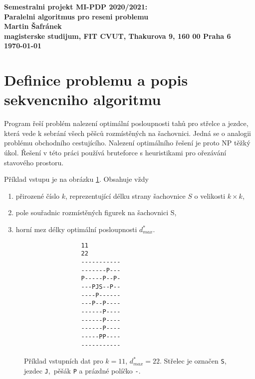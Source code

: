 \documentclass{article}
\begin{document}
    \begin{center}
        \bf Semestralni projekt MI-PDP 2020/2021:\\[5mm]
        Paralelni algoritmus pro reseni problemu\\[5mm]
        Martin Šafránek\\[2mm]
        magisterske studijum, FIT CVUT, Thakurova 9, 160 00 Praha 6\\[2mm]
        \today
    \end{center}


    \section{Definice problemu a popis sekvencniho algoritmu}

    Program řeší problém nalezení optimální posloupnosti tahů pro střelce a jezdce, která vede k sebrání
    všech pěšců rozmístěných na šachovnici. Jedná se o analogii problému obchodního cestujícího.
    Nalezení optimálního řešení je proto NP těžký úkol. Řešení v této práci používá bruteforce
    s heuristikami pro ořezávání stavového prostoru.

    Příklad vstupu je na obrázku \ref{fig:board-example}. Obsahuje vždy
    \begin{enumerate}
        \item přirozené číslo $k$, reprezentující délku strany šachovnice $S$ o velikosti $k \times k$,
        \item pole souřadnic rozmístěných figurek na šachovnici S,
        \item horní mez délky optimální posloupnosti $d^{*}_{max}$.
    \end{enumerate}

    \begin{figure}[h]
        \begin{center}
            \begin{BVerbatim}
                11
                22
                -----------
                -------P---
                P-----P--P-
                ---PJS--P--
                ----P------
                ---P--P----
                ------P----
                ------P----
                ------P----
                -----PP----
                -----------
            \end{BVerbatim}
        \end{center}
        \cprotect\caption{ Příklad vstupních dat pro $k=11$, $d^{*}_{max}=22$. Střelec je označen \verb|S|, jezdec \verb|J|,\
            pěšák \verb|P| a prázdné políčko \verb|-|. }
        \label{fig:board-example}
    \end{figure}
\end{document}
